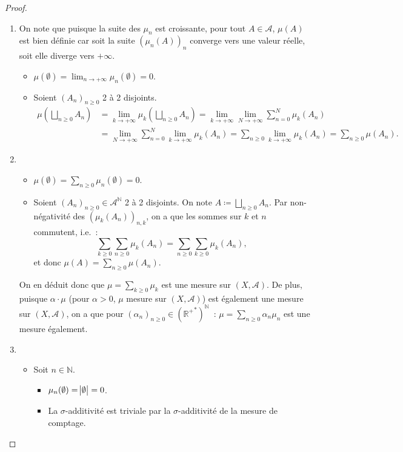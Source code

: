 \documentclass{article}
\newcommand{\pinfty}{{+\infty}}
\newcommand{\N}{{\mathbb N}}
\newcommand{\R}{{\mathbb R}}
\begin{document}
\begin{proof}~
\begin{enumerate}
	\item On note que puisque la suite des $\mu_n$ est croissante, pour tout $A \in \mathcal A$, $\mu(A)$ est bien définie car soit la suite $(\mu_n(A))_n$ converge vers une
	valeur réelle, soit elle diverge vers $\pinfty$.
	\begin{itemize}
		\item $\mu(\emptyset) = \lim_{n \to \pinfty}\mu_n(\emptyset) = 0$.
		\item Soient $(A_n)_{n \geq 0}$ 2 à 2 disjoints.
		\begin{align*}
			\mu\left(\bigsqcup_{n \geq 0}A_n\right) &= \lim_{k \to \pinfty}\mu_k\left(\bigsqcup_{n \geq 0}A_n\right) = \lim_{k \to \pinfty}\lim_{N \to \pinfty}\sum_{n=0}^N\mu_k(A_n) \\
				&= \lim_{N \to \pinfty}\sum_{n=0}^N\lim_{k \to \pinfty}\mu_k(A_n) = \sum_{n \geq 0}\lim_{k \to \pinfty}\mu_k(A_n) = \sum_{n \geq 0}\mu(A_n).
		\end{align*}
	\end{itemize}
	\item~
	\begin{itemize}
		\item $\mu(\emptyset) = \sum_{n \geq 0}\mu_n(\emptyset) = 0$.
		\item Soient $(A_n)_{n \geq 0} \in \mathcal A^\N$ 2 à 2 disjoints. On note $A \coloneqq \bigsqcup_{n \geq 0}A_n$. Par non-négativité des $(\mu_k(A_n))_{n,k}$,
		on a que les sommes sur $k$ et $n$ commutent, i.e.~:
		\[\sum_{k \geq 0}\sum_{n \geq 0}\mu_k(A_n) = \sum_{n \geq 0}\sum_{k \geq 0}\mu_k(A_n),\]
		et donc $\mu(A) = \sum_{n \geq 0}\mu(A_n)$.
	\end{itemize}
	On en déduit donc que $\mu = \sum_{k \geq 0}\mu_k$ est une mesure sur $(X, \mathcal A)$. De plus, puisque $\alpha \cdot \mu$ (pour $\alpha > 0$, $\mu$ mesure sur $(X, \mathcal A)$)
	est également une mesure sur $(X, \mathcal A)$, on a que pour $(\alpha_n)_{n \geq 0} \in \left({\R^+}^*\right)^\N$~: $\mu = \sum_{n \geq 0}\alpha_n\mu_n$ est une mesure également.
	\item~
	\begin{itemize}
		\item Soit $n \in \N$.
		\begin{itemize}
			\item $\mu_n(\emptyset) = \abs \emptyset = 0$.
			\item La $\sigma$-additivité est triviale par la $\sigma$-additivité de la mesure de comptage.

\end{itemize}
\end{itemize}
\end{enumerate}
\end{proof}
\end{document}
